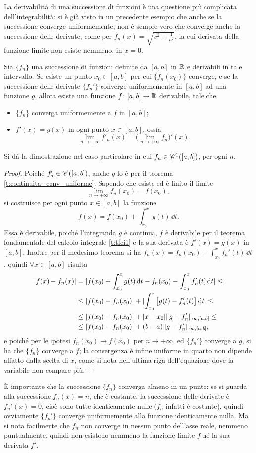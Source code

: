 La derivabilità di una successione di funzioni è una questione più complicata dell'integrabilità: si è già visto in un precedente esempio che anche se la successione converge uniformemente, non è sempre vero che converge anche la successione delle derivate, come per $f_n(x)=\sqrt{x^2+\frac1{n^2}}$, la cui derivata della funzione limite non esiste nemmeno, in $x=0$.
\begin{teorema} \label{t:scambio_derivata_limite}
Sia $\{f_n\}$ una successione di funzioni definite da $[a,b]$ in $\R$ e derivabili in tale intervallo. Se esiste un punto $x_0\in[a,b]$ per cui $\{f_n(x_0)\}$ converge, e se la successione delle derivate $\{f_n'\}$ converge uniformemente in $[a,b]$ ad una funzione $g$, allora esiste una funzione $f\colon[a,b]\to\R$ derivabile, tale che
\begin{itemize}
\item $\{f_n\}$ converga uniformemente a $f$ in $[a,b]$;
\item $f'(x)=g(x)$ in ogni punto $x\in[a,b]$, ossia
\[
\lim_{n\to+\infty}f'_n(x)=\Big(\lim_{n\to+\infty}f_n\Big)'(x).
\]
\end{itemize}
\end{teorema}
Si dà la dimostrazione nel caso particolare in cui $f_n\in\cont[1]{[a,b]}$, per ogni $n$.
\begin{proof}
Poiché $f_n'\in\cont{[a,b]}$, anche $g$ lo è per il teorema \ref{t:continuita_conv_uniforme}. Sapendo che esiste ed è finito il limite
\[
\lim_{n\to+\infty}f_n(x_0)=f(x_0),
\]
si costruisce per ogni punto $x\in[a,b]$ la funzione
\[
f(x)=f(x_0)+\int_{x_0}^xg(t)\,\dd t.
\]
Essa è derivabile, poiché l'integranda $g$ è continua, $f$ è derivabile per il teorema fondamentale del calcolo integrale \ref{t:tfci1} e la sua derivata è $f'(x)=g(x)$ in $[a,b]$. Inoltre per il medesimo teorema si ha $f_n(x)=f_n(x_0)+\int_{x_0}^xf_n'(t)\,\dd t$, quindi $\forall x\in[a,b]$ risulta
\[\begin{split}
\abs{f(x)-f_n(x)}	&=\abs{f(x_0)+\int_{x_0}^xg(t)\,\dd t-f_n(x_0)-\int_{x_0}^xf_n'(t)\,\dd t}\leq\\
				&\leq\abs{f(x_0)-f_n(x_0)}+\abs{\int_{x_0}^x\big[g(t)-f_n'(t)\big]\,\dd t}\leq\\
				&\leq\abs{f(x_0)-f_n(x_0)}+\abs{x-x_0}\norm{g-f_n'}_{\infty,[a,b]}\leq\\
				&\leq\abs{f(x_0)-f_n(x_0)}+(b-a)\norm{g-f_n'}_{\infty,[a,b]},
\end{split}\]
e poiché per le ipotesi $f_n(x_0)\to f(x_0)$ per $n\to+\infty$, ed $\{f_n'\}$ converge a $g$, si ha che $\{f_n\}$ converge a $f$; la convergenza è infine uniforme in quanto non dipende affatto dalla scelta di $x$, come si nota nell'ultima riga dell'equazione dove la variabile non compare più.
\end{proof}
È importante che la successione $\{f_n\}$ converga almeno in un punto: se si guarda alla successione $f_n(x)=n$, che è costante, la successione delle derivate è $f_n'(x)=0$, cioè sono tutte identicamente nulle ($f_n$ infatti è costante), quindi ovviamente $\{f_n'\}$ converge uniformemente alla funzione identicamente nulla. Ma si nota facilmente che $f_n$ non converge in nessun punto dell'asse reale, nemmeno puntualmente, quindi non esistono nemmeno la funzione limite $f$ né la sua derivata $f'$.

